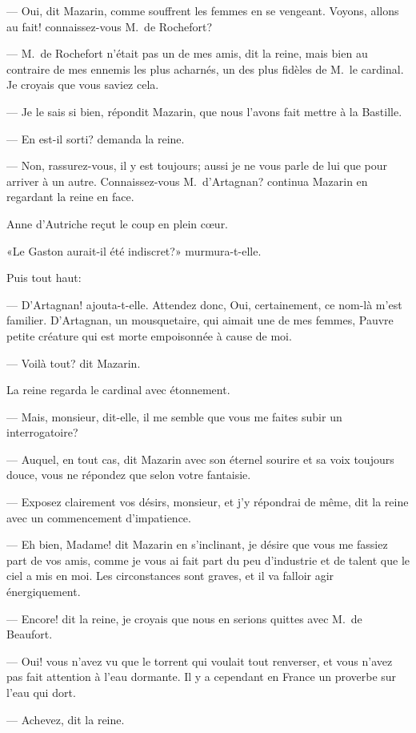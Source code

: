 — Oui, dit Mazarin, comme souffrent les femmes en se vengeant. Voyons, allons au fait! connaissez-vous M.~de Rochefort?

— M.~de Rochefort n'était pas un de mes amis, dit la reine, mais bien au contraire de mes ennemis les plus acharnés, un des plus fidèles de M.~le cardinal. Je croyais que vous saviez cela.

— Je le sais si bien, répondit Mazarin, que nous l'avons fait mettre à la Bastille.

— En est-il sorti? demanda la reine.

— Non, rassurez-vous, il y est toujours; aussi je ne vous parle de lui que pour arriver à un autre. Connaissez-vous M.~d'Artagnan? continua Mazarin en regardant la reine en face.

Anne d'Autriche reçut le coup en plein cœur.

«Le Gaston aurait-il été indiscret?» murmura-t-elle.

Puis tout haut:

— D'Artagnan! ajouta-t-elle. Attendez donc, Oui, certainement, ce nom-là m'est familier. D'Artagnan, un mousquetaire, qui aimait une de mes femmes, Pauvre petite créature qui est morte empoisonnée à cause de moi.

— Voilà tout? dit Mazarin.

La reine regarda le cardinal avec étonnement.

— Mais, monsieur, dit-elle, il me semble que vous me faites subir un interrogatoire?

— Auquel, en tout cas, dit Mazarin avec son éternel sourire et sa voix toujours douce, vous ne répondez que selon votre fantaisie.

— Exposez clairement vos désirs, monsieur, et j'y répondrai de même, dit la reine avec un commencement d'impatience.

— Eh bien, Madame! dit Mazarin en s'inclinant, je désire que vous me fassiez part de vos amis, comme je vous ai fait part du peu d'industrie et de talent que le ciel a mis en moi. Les circonstances sont graves, et il va falloir agir énergiquement.

— Encore! dit la reine, je croyais que nous en serions quittes avec M.~de Beaufort.

— Oui! vous n'avez vu que le torrent qui voulait tout renverser, et vous n'avez pas fait attention à l'eau dormante. Il y a cependant en France un proverbe sur l'eau qui dort.

— Achevez, dit la reine.

